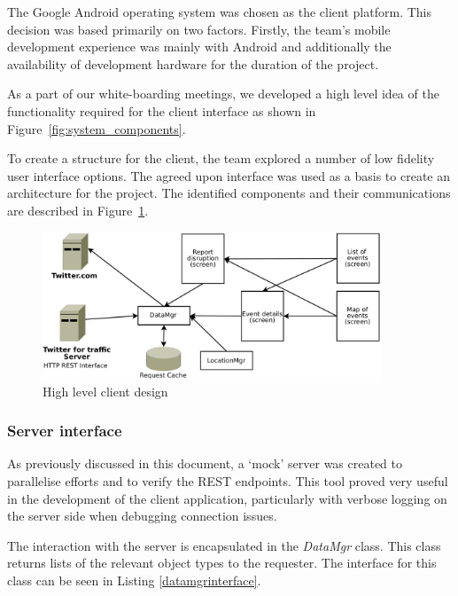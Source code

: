 The Google Android operating system was chosen as the client platform. This
decision was based primarily on two factors. Firstly, the team's mobile
development experience was mainly with Android and additionally the
availability of development hardware for the duration of the project.

As a part of our white-boarding meetings, we developed a high level idea of the
functionality required for the client interface as shown in
Figure~\ref{fig:system_components}.

To create a structure for the client, the team explored a number of low fidelity
user interface options. The agreed upon interface was used as a basis to create
an architecture for the project. The identified components and their
communications are described in Figure~\ref{fig:client_design}.

\begin{figure}[htb]
\centering
\includegraphics[width=0.9\textwidth]{images/design/client/client_high_level_layout.pdf}
\caption{High level client design}
\label{fig:client_design}
\end{figure}


\subsubsection{Server interface}
As previously discussed in this document, a `mock' server was created to
parallelise efforts and to verify the REST endpoints. This tool proved very
useful in the development of the client application, particularly with verbose
logging on the server side when debugging connection issues.

The interaction with the server is encapsulated in the \emph{DataMgr} class.
This class returns lists of the relevant object types to the requester. The
interface for this class can be seen in Listing \ref{datamgrinterface}.


